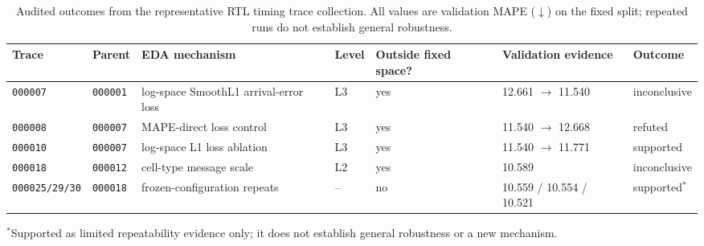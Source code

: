 %
\begin{table}[t]
\centering
\caption{Audited outcomes from the representative RTL timing trace collection. All values are validation MAPE ($\downarrow$) on the fixed split; repeated runs do not establish general robustness.}
\label{tab:discoveries}
\scriptsize
\setlength{\tabcolsep}{3pt}
\begin{tabular}{lllllll}
\toprule
\textbf{Trace} & \textbf{Parent} & \textbf{EDA mechanism} & \textbf{Level} & \textbf{Outside fixed space?} & \textbf{Validation evidence} & \textbf{Outcome} \\
\midrule
\texttt{000007} & \texttt{000001} & log-space SmoothL1 arrival-error loss & L3 & yes & 12.661 $\rightarrow$ 11.540 & inconclusive \\
\texttt{000008} & \texttt{000007} & MAPE-direct loss control & L3 & yes & 11.540 $\rightarrow$ 12.668 & refuted \\
\texttt{000010} & \texttt{000007} & log-space L1 loss ablation & L3 & yes & 11.540 $\rightarrow$ 11.771 & supported \\
\texttt{000018} & \texttt{000012} & cell-type message scale & L2 & yes & 10.589 & inconclusive \\
\texttt{000025/29/30} & \texttt{000018} & frozen-configuration repeats & -- & no & 10.559 / 10.554 / 10.521 & supported$^{*}$ \\
\bottomrule
\end{tabular}
\vspace{2pt}
\begin{minipage}{0.96\textwidth}
\footnotesize $^{*}$Supported as limited repeatability evidence only; it does not establish general robustness or a new mechanism.
\end{minipage}
\end{table}